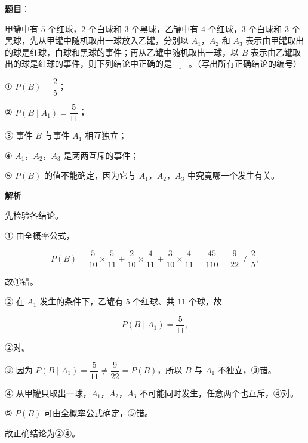 \begin{answer}

\textbf{题目}：

甲罐中有 $5$ 个红球，$2$ 个白球和 $3$ 个黑球，乙罐中有 $4$ 个红球，$3$ 个白球和 $3$ 个黑球，先从甲罐中随机取出一球放入乙罐，分别以 $A_1$，$A_2$ 和 $A_3$ 表示由甲罐取出的球是红球，白球和黑球的事件；再从乙罐中随机取出一球，以 $B$ 表示由乙罐取出的球是红球的事件，则下列结论中正确的是$\underline{\qquad}$。（写出所有正确结论的编号）

① $P(B)=\dfrac25$；

② $P(B\mid A_1)=\dfrac5{11}$；

③ 事件 $B$ 与事件 $A_1$ 相互独立；

④ $A_1$，$A_2$，$A_3$ 是两两互斥的事件；

⑤ $P(B)$ 的值不能确定，因为它与 $A_1$，$A_2$，$A_3$ 中究竟哪一个发生有关。

\textbf{解析}

先检验各结论。

① 由全概率公式，

\nopagebreak[4]
\[P(B)=\frac5{10}\times\frac5{11}+\frac2{10}\times\frac4{11}+\frac3{10}\times\frac4{11}
=\frac{45}{110}=\frac9{22}\neq\frac25,\]

故①错。

② 在 $A_1$ 发生的条件下，乙罐有 $5$ 个红球、共 $11$ 个球，故

\nopagebreak[4]
\[P(B\mid A_1)=\frac5{11},\]

②对。

③ 因为 $P(B\mid A_1)=\dfrac5{11}\neq\dfrac9{22}=P(B)$，所以 $B$ 与 $A_1$ 不独立，③错。

④ 从甲罐只取出一球，$A_1$，$A_2$，$A_3$ 不可能同时发生，任意两个也互斥，④对。

⑤ $P(B)$ 可由全概率公式确定，⑤错。

故正确结论为②④。


\end{answer}
